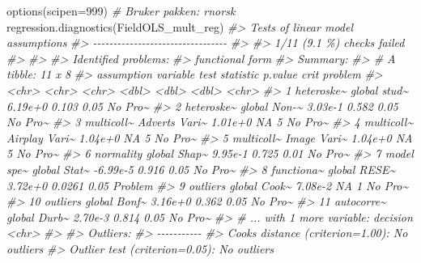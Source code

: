 \documentclass[
]{article}
\newenvironment{Shaded}{\begin{snugshade}}{\end{snugshade}}
\newcommand{\AttributeTok}[1]{\textcolor[rgb]{0.77,0.63,0.00}{#1}}
\newcommand{\CommentTok}[1]{\textcolor[rgb]{0.56,0.35,0.01}{\textit{#1}}}
\newcommand{\DecValTok}[1]{\textcolor[rgb]{0.00,0.00,0.81}{#1}}
\newcommand{\FunctionTok}[1]{\textcolor[rgb]{0.00,0.00,0.00}{#1}}
\newcommand{\NormalTok}[1]{#1}
\begin{document}
\begin{Shaded}
\begin{Highlighting}[]
\FunctionTok{options}\NormalTok{(}\AttributeTok{scipen=}\DecValTok{999}\NormalTok{)}
\CommentTok{\# Bruker pakken: rnorsk}
\FunctionTok{regression.diagnostics}\NormalTok{(FieldOLS\_mult\_reg)}
\CommentTok{\#\textgreater{} Tests of linear model assumptions}
\CommentTok{\#\textgreater{} {-}{-}{-}{-}{-}{-}{-}{-}{-}{-}{-}{-}{-}{-}{-}{-}{-}{-}{-}{-}{-}{-}{-}{-}{-}{-}{-}{-}{-}{-}{-}{-}{-}}
\CommentTok{\#\textgreater{} }
\CommentTok{\#\textgreater{} 1/11 (9.1 \%) checks failed}
\CommentTok{\#\textgreater{} }
\CommentTok{\#\textgreater{} }
\CommentTok{\#\textgreater{} Identified problems: }
\CommentTok{\#\textgreater{}  functional form}
\CommentTok{\#\textgreater{} Summary:}
\CommentTok{\#\textgreater{} \# A tibble: 11 x 8}
\CommentTok{\#\textgreater{}    assumption variable test  statistic p.value  crit problem}
\CommentTok{\#\textgreater{}    \textless{}chr\textgreater{}      \textless{}chr\textgreater{}    \textless{}chr\textgreater{}     \textless{}dbl\textgreater{}   \textless{}dbl\textgreater{} \textless{}dbl\textgreater{} \textless{}chr\textgreater{}  }
\CommentTok{\#\textgreater{}  1 heteroske\textasciitilde{} global   stud\textasciitilde{}   6.19e+0  0.103   0.05 No Pro\textasciitilde{}}
\CommentTok{\#\textgreater{}  2 heteroske\textasciitilde{} global   Non{-}\textasciitilde{}   3.03e{-}1  0.582   0.05 No Pro\textasciitilde{}}
\CommentTok{\#\textgreater{}  3 multicoll\textasciitilde{} Adverts  Vari\textasciitilde{}   1.01e+0 NA       5    No Pro\textasciitilde{}}
\CommentTok{\#\textgreater{}  4 multicoll\textasciitilde{} Airplay  Vari\textasciitilde{}   1.04e+0 NA       5    No Pro\textasciitilde{}}
\CommentTok{\#\textgreater{}  5 multicoll\textasciitilde{} Image    Vari\textasciitilde{}   1.04e+0 NA       5    No Pro\textasciitilde{}}
\CommentTok{\#\textgreater{}  6 normality  global   Shap\textasciitilde{}   9.95e{-}1  0.725   0.01 No Pro\textasciitilde{}}
\CommentTok{\#\textgreater{}  7 model spe\textasciitilde{} global   Stat\textasciitilde{}  {-}6.99e{-}5  0.916   0.05 No Pro\textasciitilde{}}
\CommentTok{\#\textgreater{}  8 functiona\textasciitilde{} global   RESE\textasciitilde{}   3.72e+0  0.0261  0.05 Problem}
\CommentTok{\#\textgreater{}  9 outliers   global   Cook\textasciitilde{}   7.08e{-}2 NA       1    No Pro\textasciitilde{}}
\CommentTok{\#\textgreater{} 10 outliers   global   Bonf\textasciitilde{}   3.16e+0  0.362   0.05 No Pro\textasciitilde{}}
\CommentTok{\#\textgreater{} 11 autocorre\textasciitilde{} global   Durb\textasciitilde{}   2.70e{-}3  0.814   0.05 No Pro\textasciitilde{}}
\CommentTok{\#\textgreater{} \# ... with 1 more variable: decision \textless{}chr\textgreater{}}
\CommentTok{\#\textgreater{} }
\CommentTok{\#\textgreater{} Outliers:}
\CommentTok{\#\textgreater{} {-}{-}{-}{-}{-}{-}{-}{-}{-}{-}{-}}
\CommentTok{\#\textgreater{} Cook\textquotesingle{}s distance (criterion=1.00): No outliers}
\CommentTok{\#\textgreater{} Outlier test (criterion=0.05): No outliers}
\end{Highlighting}
\end{Shaded}
\end{document}
